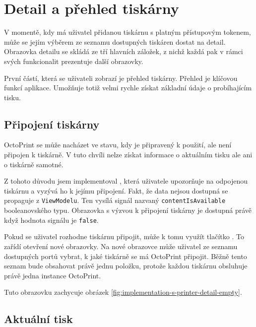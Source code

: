 \section{Detail a přehled tiskárny}

V momentě, kdy má uživatel přidanou tiskárnu s platným přístupovým tokenem, může se jejím výběrem ze seznamu dostupných tiskáren dostat na detail.
Obrazovka detailu se skládá ze tří hlavních záložek, z nichž každá pak v rámci svých funkcionalit prezentuje další obrazovky.

První částí, která se uživateli zobrazí je přehled tiskárny.
Přehled je klíčovou funkcí aplikace.
Umožňuje totiž velmi rychle získat základní údaje o probíhajícím tisku.

\subsection{Připojení tiskárny}

OctoPrint se může nacházet ve stavu, kdy je připravený k použití, ale není připojen k tiskárně.
V tuto chvíli nelze získat informace o aktuálním tisku ale ani o tiskárně samotné.

Z tohoto důvodu jsem implementoval , která uživatele upozorňuje na odpojenou tiskárnu a vyzývá ho k jejímu připojení.
Fakt, že data nejsou dostupná se propaguje z \texttt{ViewModelu}.
Ten vysílá signál nazvaný \texttt{contentIsAvailable} booleanovského typu.
Obrazovka s výzvou k připojení tiskárny je dostupná právě když hodnota signálu je \texttt{false}.

Pokud se uživatel rozhodne tiskárnu připojit, může k tomu využít tlačítko .
To zařídí otevření nové obrazovky.
Na nové obrazovce může uživatel ze seznamu dostupných portů vybrat, k jaké tiskárně se má OctoPrint připojit.
Běžně tento seznam bude obsahovat právě jednu položku, protože každou tiskárnu obsluhuje právě jedna instance OctoPrint.

Tuto obrazovku zachycuje obrázek \ref{fig:implementation-s-printer-detail-empty}.


\subsection{Aktuální tisk}\label{detail-tiskarny-aktualni-tisk}

